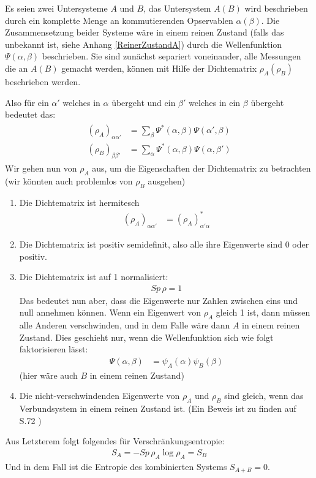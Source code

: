 \documentclass[ngerman]{scrartcl}
\begin{document}
	Es seien zwei Untersysteme $A$ und $B$, das Untersystem $A(B)$ wird beschrieben durch ein komplette Menge an kommutierenden Opservablen $\alpha(\beta)$. Die Zusammensetzung beider Systeme wäre in einem reinen Zustand (falls das unbekannt ist, siehe Anhang \ref{ReinerZustandA}) durch die Wellenfunktion $\Psi(\alpha,\beta)$ beschrieben. Sie sind zunächst separiert voneinander, alle Messungen die an $A(B)$ gemacht werden, können mit Hilfe der Dichtematrix $\rho_A(\rho_B)$ beschrieben werden.
	
	Also für ein $\alpha'$ welches in $\alpha$ übergeht und ein $\beta'$ welches in ein $\beta$ übergeht bedeutet das:
		\begin{align}
			\begin{aligned}
			(\rho_A)_{\alpha \alpha'} &=
			\sum_{\beta} \Psi^*(\alpha, \beta) \Psi(\alpha', \beta) \\
			(\rho_B)_{\beta \beta'} &= 
			\sum_{\alpha} \Psi^* (\alpha, \beta) \Psi (\alpha, \beta')
			\end{aligned}
		\end{align}
	Wir gehen nun von $\rho_A$ aus, um die Eigenschaften der Dichtematrix zu betrachten (wir könnten auch problemlos von $\rho_B$ ausgehen)
	\begin{enumerate}[1)]
		\item Die Dichtematrix ist hermitesch
			\begin{align}
				(\rho_A)_{\alpha \alpha'} &= (\rho_A)^*_{\alpha' \alpha}
			\end{align}
		\item Die Dichtematrix ist positiv semidefinit, also alle ihre Eigenwerte sind 0 oder positiv.
		\item Die Dichtematrix ist auf 1 normalisiert:
			\begin{align}
				Sp \, \rho = 1
			\end{align}
		Das bedeutet nun aber, dass die Eigenwerte nur Zahlen zwischen eins und null annehmen können. Wenn ein Eigenwert von $\rho_A$ gleich 1 ist, dann müssen alle Anderen verschwinden, und in dem Falle wäre dann $A$ in einem reinen Zustand. 
		Dies geschieht nur, wenn die Wellenfunktion sich wie folgt faktorisieren lässt:
			\begin{align}
				\Psi (\alpha, \beta) &= \psi_A(\alpha) \psi_B (\beta)
			\end{align} 
		(hier wäre auch $B$ in einem reinen Zustand)
		\item Die nicht-verschwindenden Eigenwerte von $\rho_A$ und $\rho_B$ sind gleich, wenn das Verbundsystem in einem reinen Zustand ist. (Ein Beweis ist zu finden auf S.72 \cite{Revolution})
	\end{enumerate}
Aus Letzterem folgt folgendes für Verschränkungsentropie:
	\begin{align}
		S_A = -Sp \, \rho_A \log \rho_A = S_B
	\end{align}
Und in dem Fall ist die Entropie des kombinierten Systems $S_{A+B} = 0$.
\end{document}
